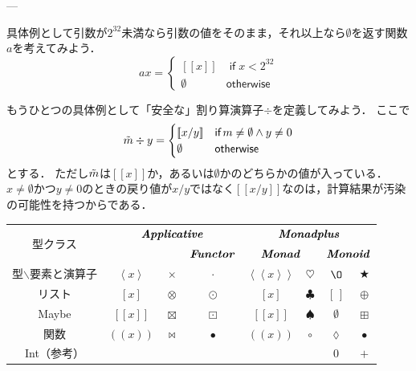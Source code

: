 \documentclass[a4paper]{jsbook}
\def\[{\left[\!\left[}
\def\]{\right]\!\right]}
\def\({\left(\!\left(}
\def\){\right)\!\right)}
\DeclareMathOperator{\mMapList}{\odot}
\newcommand{\mathTypeClass}[1]{\textbf{\emph{#1}}} %
\newcommand{\mathMaybeVar}[1]{\Tilde{#1}}
\newcommand{\mathListWith}[1]{\left[#1\right]}
\newcommand{\mathMaybeWith}[1]{\[#1\]}
\newcommand{\mathPureWith}[1]{\left\langle#1\right\rangle}
\newcommand{\mathUnitWith}[1]{\left\langle\!\left\langle#1\right\rangle\!\right\rangle}
\newcommand{\mathId}{\O}
\newcommand{\mathEmptyList}{{[\,]}}
\newcommand{\mathNothing}{\emptyset}
\newcommand{\mathAnonymousParameter}{\lozenge}
\newcommand{\mathAnyBinaryOperator}{\mathbin{\bigstar}}
\newcommand{\mathAnd}{\mathbin{\wedge}}
\newcommand{\mathAppend}{\oplus}
\newcommand{\mathApplicativeGeneralMap}{\mathbin{\times}}
\newcommand{\mathApplicativeMap}{\mathbin{\otimes}}
\newcommand{\mathApplicativeMaybeMap}{\mathbin{\boxtimes}}
\newcommand{\mathCompose}{\mathbin{\bullet}}
\newcommand{\mathGeneralMap}{\mathbin{\cdot}}
\newcommand{\mathMaybeMap}{\mathbin{\boxdot}}
\newcommand{\mathKeyword}[1]{\operatorname{\textsf{#1}}}
\newcommand{\mathIf}{\mathKeyword{if}}
\newcommand{\mathOtherwise}{\mathKeyword{otherwise}}
\DeclareMathOperator{\hsklMaybeAppend}{{DO NOT USE}--\boxplus}
\DeclareMathOperator{\hsklMonadMap}{{DO NOT USE}--\heartsuit}
\begin{document}
---

具体例として引数が$2^{32}$未満なら引数の値をそのまま，それ以上なら$\mathNothing$を返す関数$a$を考えてみよう．
\begin{equation}
ax=\begin{cases}
\mathMaybeWith{x}&\mathIf x<2^{32}\\
\mathNothing&\mathOtherwise
\end{cases}
\end{equation}


もうひとつの具体例として「安全な」割り算演算子$\div$を定義してみよう．
ここで
\begin{equation}
\mathMaybeVar{m}\div y=\begin{cases}\mathMaybeWith{x/y}&\mathIf m\neq\mathNothing\mathAnd y\neq0\\
\mathNothing&\mathOtherwise\end{cases}
\end{equation}
とする．
ただし$\mathMaybeVar{m}$は$\mathMaybeWith{x}$か，あるいは$\mathNothing$かのどちらかの値が入っている．
$x\neq\mathNothing$かつ$y\neq0$のときの戻り値が$x/y$ではなく$\mathMaybeWith{x/y}$なのは，計算結果が汚染の可能性を持つからである．


\begin{table}
\begin{center}
\begin{tabular}{||c||c|c|c|c|c|c|c||}
\hline
\multirow{2}{*}{型クラス}
    &\multicolumn{3}{|c|}{$\mathTypeClass{Applicative}$}
    &\multicolumn{4}{|c||}{$\mathTypeClass{Monadplus}$}\\
\cline{4-8}
\multirow{1}{*}{}
    &\multicolumn{2}{|c|}{ }
    &$\mathTypeClass{Functor}$
    &\multicolumn{2}{|c}{$\mathTypeClass{Monad}$}
    &\multicolumn{2}{|c||}{$\mathTypeClass{Monoid}$}\\
\hline\hline
型$\backslash$要素と演算子
    &$\mathPureWith{x}$
    &$\mathApplicativeGeneralMap$
    &$\mathGeneralMap$
    &$\mathUnitWith{x}$
    &$\heartsuit$%
    &$\mathId$
    &$\mathAnyBinaryOperator$\\
\hline
リスト
    &$[x]$
    &$\mathApplicativeMap$
    &$\mMapList$
    &$\mathListWith{x}$
    &$\clubsuit$
    &$\mathEmptyList$
    &$\mathAppend$\\
\hline
Maybe
    &$\mathMaybeWith{x}$
    &$\mathApplicativeMaybeMap$
    &$\mathMaybeMap$
    &$\mathMaybeWith{x}$
    &$\spadesuit$
    &$\mathNothing$
    &$\boxplus$\\%
\hline
関数
    &$\(x\)$
    &$\bowtie$
    &$\mathCompose$
    &$\(x\)$
    &$\circ$
    &$\mathAnonymousParameter$
    &$\mathCompose$\\
\hline
Int（参考）
    &
    &
    &
    &
    &
    &$0$
    &$+$\\
\hline
\end{tabular}
\end{center}
\end{table}
\end{document}

